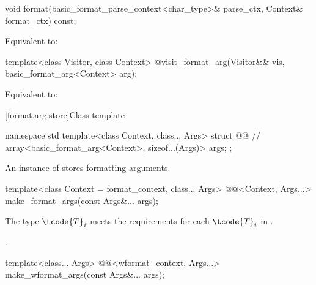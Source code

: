 %
\begin{itemdecl}
void format(basic_format_parse_context<char_type>& parse_ctx, Context& format_ctx) const;
\end{itemdecl}

\begin{itemdescr}
\pnum
\effects
Equivalent to: 
\end{itemdescr}

%
\begin{itemdecl}
template<class Visitor, class Context>
  @\seebelow@ visit_format_arg(Visitor&& vis, basic_format_arg<Context> arg);
\end{itemdecl}

\begin{itemdescr}
\pnum
\effects
Equivalent to: 
\end{itemdescr}

[format.arg.store]{Class template }

\begin{codeblock}
namespace std {
  template<class Context, class... Args>
  struct @@ {      // \expos
    array<basic_format_arg<Context>, sizeof...(Args)> args;
  };
}
\end{codeblock}

\pnum
An instance of  stores formatting arguments.

%
\begin{itemdecl}
template<class Context = format_context, class... Args>
  @@<Context, Args...> make_format_args(const Args&... args);
\end{itemdecl}

\begin{itemdescr}
\pnum
\expects
The type
$\tcode{T}_i$\tcode{>}
meets the  requirements
for each $\tcode{T}_i$ in .

\pnum
\returns
{}.
\end{itemdescr}

%
\begin{itemdecl}
template<class... Args>
  @@<wformat_context, Args...> make_wformat_args(const Args&... args);
\end{itemdecl}

